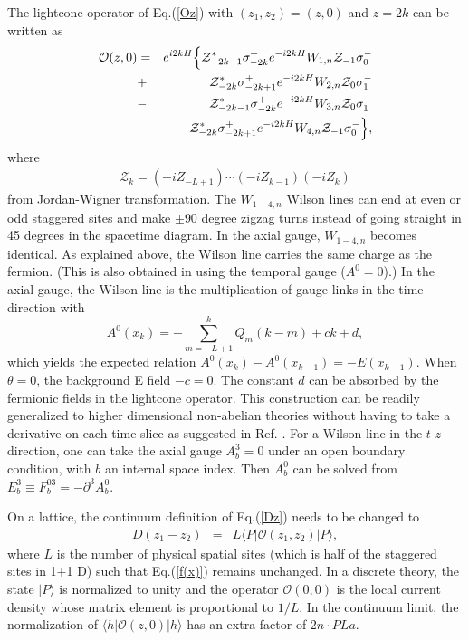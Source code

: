 \documentclass[aps,prd,twocolumn,tightenlines,superscriptaddress,
nofootinbib,preprintnumbers]{revtex4-1}
\begin{document}
The lightcone operator of Eq.(\ref{Oz}) with $(z_1,z_2)=(z,0)$ and $z=2k$ can be written as \cite{Li:2021kcs}
\begin{eqnarray}
\label{OO1}
\mathcal{O}(z,0)
&=&e^{i2 k H}\Bigl\{\mathcal{Z}^{*}_{-2k-1}\sigma^+_{-2k} e^{-i2 k H} W_{1,n} \mathcal{Z}_{-1}\sigma_{0}^-\nonumber\\
&+&\mathcal{Z}^*_{-2k}\sigma^+_{-2k+1} e^{-i2 k H} W_{2,n}\mathcal{Z}_{0}\sigma_{1}^-\nonumber\\
&-&\mathcal{Z}^*_{-2k-1}\sigma^+_{-2k} e^{-i2 k H} W_{3,n}\mathcal{Z}_{0}\sigma_{1}^-\nonumber\\
&-&\mathcal{Z}^*_{-2k}\sigma^+_{-2k+1}e^{-i2 k H} W_{4,n}\mathcal{Z}_{-1}\sigma_{0}^-\Bigr\},
\end{eqnarray}
where 
\begin{eqnarray}
\mathcal{Z}_k=(-iZ_{-L+1})\cdots (-iZ_{k-1})(-iZ_{k})
\end{eqnarray}
from Jordan-Wigner transformation. The $W_{1-4,n}$ Wilson lines can end at even or odd staggered sites and make $\pm 90$ degree zigzag turns instead of going straight in 45 degrees in the spacetime diagram. In the axial gauge, $W_{1-4,n}$ becomes identical. As explained above, the Wilson line carries the same charge as the fermion. (This is also obtained in \cite{Schneider:2024yub,Banuls:2025wiq} using the temporal gauge ($A^0=0$).) In the axial gauge, the Wilson line is the multiplication of gauge links in the time direction with 
\begin{equation}
\label{A0}
A^0(x_k)=-\sum_{m=-L+1}^k Q_m(k-m)+ c k + d ,
\end{equation}
which yields the expected relation $A^0(x_k)-A^0(x_{k-1})=-E(x_{k-1})$. When $\theta=0$, the background E field $-c=0$. The constant $d$ can be absorbed by the fermionic fields in the lightcone operator. This construction can be readily generalized to higher dimensional non-abelian theories without having to take a derivative on each time slice as suggested in Ref. \cite{Lamm:2019uyc}. For a Wilson line in the $t$-$z$ direction, one can take the axial gauge $A^3_b=0$ under an open boundary condition, with $b$ an internal space index. Then $A_b^0$ can be solved from $E_b^3\equiv F_b^{03}=-\partial^3 A_b^0$. 

On a lattice, the continuum definition of Eq.(\ref{Dz}) needs to be changed to
\begin{eqnarray}
   D(z_1-z_2) 
    &=& L\langle P|\mathcal{O}(z_1,z_2)|P \rangle ,
\end{eqnarray}
where $L$ is the number of physical spatial sites (which is half of the staggered sites in 1+1 D) such that Eq.(\ref{f(x)}) remains unchanged. In a discrete theory, the state $|P \rangle$ is normalized to unity and the operator $\mathcal{O}(0,0)$ is the local current density whose matrix element is proportional to $1/L$. 
In the continuum limit, the normalization of $\langle h|\mathcal{O}(z,0)|h \rangle$ has an extra factor of $2 n\cdot P L a$.
\end{document}

